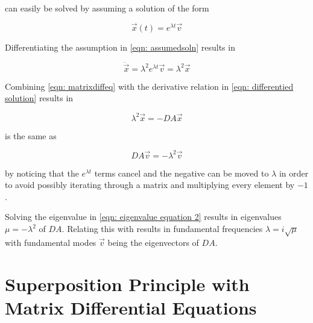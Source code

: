 \documentclass[10pt,a4paper]{article}
\begin{document}
\begin{multicols*}{2}
 can easily be solved by assuming a solution of the form

\begin{equation}
	\vec{x} (t) = e^{\lambda t} \vec{v}
	\label{eqn: assumedsoln}
\end{equation}

Differentiating the assumption in \cref{eqn: assumedsoln} results in

\begin{equation}
	\ddot{\vec{x}} = \lambda^2 e^{\lambda t} \vec{v} = \lambda^2 \vec{x}
	\label{eqn: differentied solution}
\end{equation}

Combining \cref{eqn: matrixdiffeq} with the derivative relation in \cref{eqn: differentied solution} results in

\begin{equation}
	\lambda^2 \vec{x} = -DA \vec{x}
	\label{eqn: eigenvalue equation 1}
\end{equation}

 is the same as

\begin{equation}
	DA \vec{v} = - \lambda^2 \vec{v}
	\label{eqn: eigenvalue equation 2}
\end{equation}

by noticing that the $e^{\lambda t}$ terms cancel and the negative can be moved to $\lambda$ in order to avoid possibly iterating through a matrix and multiplying every element by $-1$.

Solving the eigenvalue in \cref{eqn: eigenvalue equation 2} results in eigenvalues $\mu = -\lambda^2$ of $DA$. Relating this with  results in fundamental frequencies $\lambda = i \sqrt{\mu}$ with fundamental modes $\vec{v}$ being the eigenvectors of $DA$.

\section*{Superposition Principle with Matrix Differential Equations}
\end{multicols*}
\end{document}

